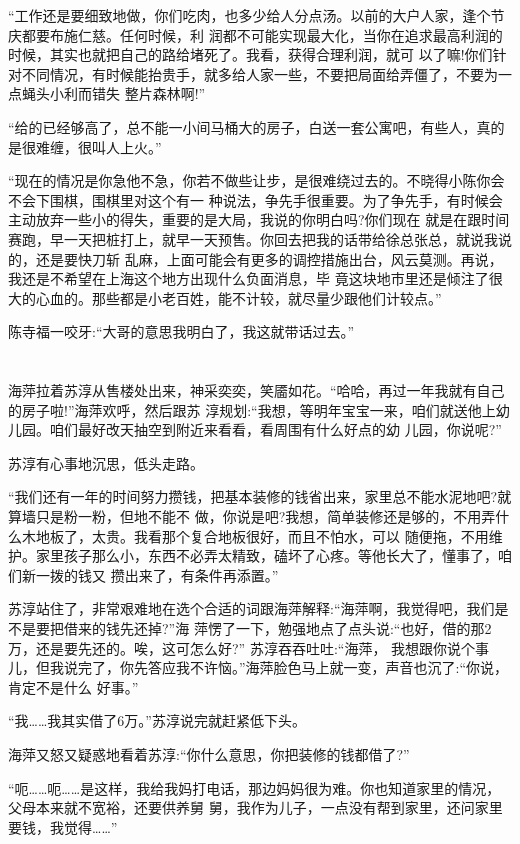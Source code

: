 \documentclass[11pt,a4paper,onecolumn]{article}
\begin{document}
``工作还是要细致地做，你们吃肉，也多少给人分点汤。以前的大户人家，逢个节庆都要布施仁慈。任何时候，利
润都不可能实现最大化，当你在追求最高利润的时候，其实也就把自己的路给堵死了。我看，获得合理利润，就可
以了嘛!你们针对不同情况，有时候能抬贵手，就多给人家一些，不要把局面给弄僵了，不要为一点蝇头小利而错失
整片森林啊!''

``给的已经够高了，总不能一小间马桶大的房子，白送一套公寓吧，有些人，真的是很难缠，很叫人上火。''

``现在的情况是你急他不急，你若不做些让步，是很难绕过去的。不晓得小陈你会不会下围棋，围棋里对这个有一
种说法，争先手很重要。为了争先手，有时候会主动放弃一些小的得失，重要的是大局，我说的你明白吗?你们现在
就是在跟时间赛跑，早一天把桩打上，就早一天预售。你回去把我的话带给徐总张总，就说我说的，还是要快刀斩
乱麻，上面可能会有更多的调控措施出台，风云莫测。再说，我还是不希望在上海这个地方出现什么负面消息，毕
竟这块地市里还是倾注了很大的心血的。那些都是小老百姓，能不计较，就尽量少跟他们计较点。''

陈寺福一咬牙:``大哥的意思我明白了，我这就带话过去。''

\section[\thesection]{}

海萍拉着苏淳从售楼处出来，神采奕奕，笑靥如花。``哈哈，再过一年我就有自己的房子啦!''海萍欢呼，然后跟苏
淳规划:``我想，等明年宝宝一来，咱们就送他上幼儿园。咱们最好改天抽空到附近来看看，看周围有什么好点的幼
儿园，你说呢?''

苏淳有心事地沉思，低头走路。

``我们还有一年的时间努力攒钱，把基本装修的钱省出来，家里总不能水泥地吧?就算墙只是粉一粉，但地不能不
做，你说是吧?我想，简单装修还是够的，不用弄什么木地板了，太贵。我看那个复合地板很好，而且不怕水，可以
随便拖，不用维护。家里孩子那么小，东西不必弄太精致，磕坏了心疼。等他长大了，懂事了，咱们新一拨的钱又
攒出来了，有条件再添置。''

苏淳站住了，非常艰难地在选个合适的词跟海萍解释:``海萍啊，我觉得吧，我们是不是要把借来的钱先还掉?''海
萍愣了一下，勉强地点了点头说:``也好，借的那2万，还是要先还的。唉，这可怎么好?'' 苏淳吞吞吐吐:``海萍，
我想跟你说个事儿，但我说完了，你先答应我不许恼。''海萍脸色马上就一变，声音也沉了:``你说，肯定不是什么
好事。''

``我……我其实借了6万。''苏淳说完就赶紧低下头。

海萍又怒又疑惑地看着苏淳:``你什么意思，你把装修的钱都借了?''

``呃……呃……是这样，我给我妈打电话，那边妈妈很为难。你也知道家里的情况，父母本来就不宽裕，还要供养舅
舅，我作为儿子，一点没有帮到家里，还问家里要钱，我觉得……''
\end{document}
